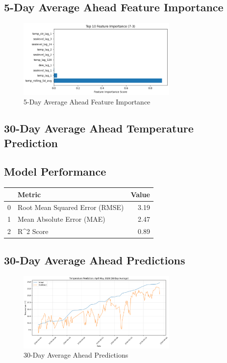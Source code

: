 \subsection{5-Day Average Ahead Feature Importance}
\begin{figure}[htbp]
\centering
\includegraphics[width=0.7\textwidth]{7-3-random_forest_temp_feature_importance.png}
\caption{5-Day Average Ahead Feature Importance}
\label{fig:5-day_average_ahead_featimp}
\end{figure}



\subsection{30-Day Average Ahead Temperature Prediction}
\subsection{Model Performance}
\begin{tabular}{llr}
\toprule
 & Metric & Value \\
\midrule
0 & Root Mean Squared Error (RMSE) & 3.19 \\
1 & Mean Absolute Error (MAE) & 2.47 \\
2 & R^2 Score & 0.89 \\
\bottomrule
\end{tabular}

\subsection{30-Day Average Ahead Predictions}
\begin{figure}[htbp]
\centering
\includegraphics[width=0.7\textwidth]{7-4-random_forest_temp_prediction_results.png}
\caption{30-Day Average Ahead Predictions}
\label{fig:30-day_average_ahead_pred}
\end{figure}

